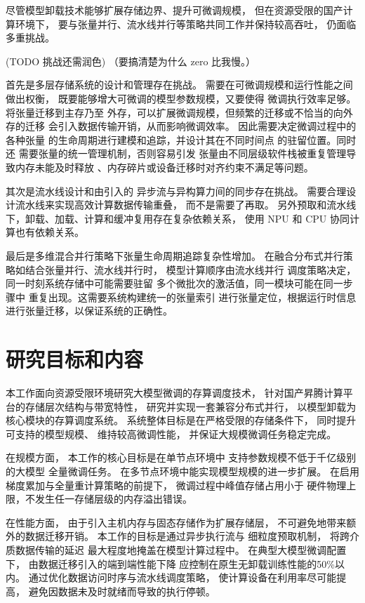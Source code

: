 \documentclass[bachelor,openany,oneside,color,AutoFakeBold=true]{buaathesis}
\begin{document}
尽管模型卸载技术能够扩展存储边界、提升可微调规模，
但在资源受限的国产计算环境下，
要与张量并行、流水线并行等策略共同工作并保持较高吞吐，
仍面临多重挑战。

(TODO 挑战还需润色)
（要搞清楚为什么 zero 比我慢。）

首先是多层存储系统的设计和管理存在挑战。
需要在可微调规模和运行性能之间做出权衡，
既要能够增大可微调的模型参数规模，又要使得
微调执行效率足够。将张量迁移到主存乃至
外存，可以扩展微调规模，但频繁的迁移或不恰当的向外存的迁移
会引入数据传输开销，从而影响微调效率。
因此需要决定微调过程中的各种张量
的生命周期进行建模和追踪，并设计其在不同时间点
的驻留位置。同时还
需要张量的统一管理机制，否则容易引发
张量由不同层级软件栈被重复管理导致内存未能及时释放
、内存碎片或设备迁移时对齐约束不满足等问题。


其次是流水线设计和由引入的
异步流与异构算力间的同步存在挑战。
需要合理设计流水线来实现高效计算数据传输重叠，
而不是需要了再取。
另外预取和流水线下，卸载、加载、计算和缓冲复用存在复杂依赖关系，
使用 NPU 和 CPU 协同计算也有依赖关系。

最后是多维混合并行策略下张量生命周期追踪复杂性增加。
在融合分布式并行策略如结合张量并行、流水线并行时，
模型计算顺序由流水线并行
调度策略决定，同一时刻系统存储中可能需要驻留
多个微批次的激活值，同一模块可能在同一步骤中
重复出现。这需要系统构建统一的张量索引
进行张量定位，根据运行时信息进行张量迁移，以保证系统的正确性。


\section{研究目标和内容}

本工作面向资源受限环境研究大模型微调的存算调度技术，
针对国产昇腾计算平台的存储层次结构与带宽特性，
研究并实现一套兼容分布式并行，
以模型卸载为核心模块的存算调度系统。
系统整体目标是在严格受限的存储条件下，
同时提升可支持的模型规模、
维持较高微调性能，
并保证大规模微调任务稳定完成。

在规模方面，
本工作的核心目标是在单节点环境中
支持参数规模不低于千亿级别的大模型
全量微调任务。
在多节点环境中能实现模型规模的进一步扩展。
在启用梯度累加与全量重计算策略的前提下，
微调过程中峰值存储占用小于
硬件物理上限，不发生任一存储层级的内存溢出错误。

在性能方面，
由于引入主机内存与固态存储作为扩展存储层，
不可避免地带来额外的数据迁移开销。
本工作的目标是通过异步执行流与
细粒度预取机制，
将跨介质数据传输的延迟
最大程度地掩盖在模型计算过程中。
在典型大模型微调配置下，
由数据迁移引入的端到端性能下降
应控制在原生无卸载训练性能的50\%以内。
通过优化数据访问时序与流水线调度策略，
使计算设备在利用率尽可能提高，
避免因数据未及时就绪而导致的执行停顿。
\end{document}
